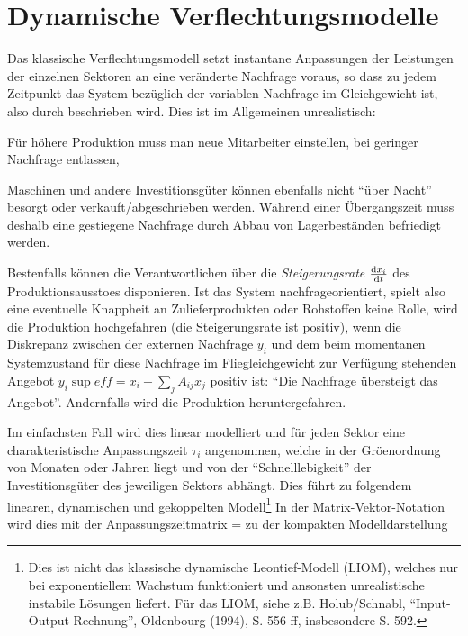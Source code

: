 \section{Dynamische Verflechtungsmodelle}
\EinsteinBeg

Das klassische Verflechtungsmodell setzt instantane Anpassungen der
Leistungen der einzelnen Sektoren an eine ver\"anderte Nachfrage
voraus, so dass zu jedem Zeitpunkt das System bez\"uglich der
variablen Nachfrage im Gleichgewicht ist, also durch 
beschrieben wird. Dies ist im Allgemeinen unrealistisch:
\bi
\item F\"ur h\"ohere Produktion muss man neue Mitarbeiter einstellen,
bei geringer Nachfrage entlassen,
\item Maschinen und andere Investitionsg\"uter k\"onnen ebenfalls
nicht ``\"uber Nacht'' besorgt oder verkauft/abgeschrieben
werden. W\"ahrend einer \"Ubergangszeit muss deshalb eine gestiegene
Nachfrage durch Abbau von Lagerbest\"anden befriedigt werden.
\ei

Bestenfalls k\"onnen die Verantwortlichen \"uber die
\textit{Steigerungsrate} $\frac{{\rm d} x_i}{{\rm d} t}$ des Produktionsaussto\3es disponieren.
Ist das System nachfrageorientiert, spielt also eine eventuelle
Knappheit an Zulieferprodukten oder Rohstoffen keine Rolle, 
wird die Produktion hochgefahren (die
Steigerungsrate ist positiv), wenn die Diskrepanz zwischen der
externen Nachfrage $y_i$ und dem beim momentanen Systemzustand
f\"ur diese Nachfrage im Flie\3gleichgewicht zur Verf\"ugung stehenden  Angebot
$y_i\sup{eff}=x_i-\sum_jA_{ij}x_j$ positiv ist: ``Die Nachfrage \"ubersteigt das
Angebot''. Andernfalls wird die Produktion heruntergefahren.

Im einfachsten Fall wird dies linear modelliert und f\"ur jeden Sektor
eine charakteristische Anpassungszeit $\tau_i$ angenommen, welche in
der Gr\"o\3enordnung von Monaten oder Jahren liegt und von der
``Schnelllebigkeit'' der Investitionsg\"uter des jeweiligen Sektors abh\"angt. Dies f\"uhrt zu
folgendem linearen, dynamischen und gekoppelten 
Modell\footnote{Dies
ist nicht das klassische dynamische Leontief-Modell (LIOM), welches nur bei
exponentiellem Wachstum funktioniert und ansonsten unrealistische
instabile L\"osungen liefert. F\"ur das LIOM, siehe z.B. Holub/Schnabl,
``Input-Output-Rechnung'', Oldenbourg (1994), S. 556 ff, insbesondere
S. 592.}
In der Matrix-Vektor-Notation wird dies mit der Anpassungszeitmatrix
\be
\vec{\tau}=
\ee
zu der kompakten Modelldarstellung


